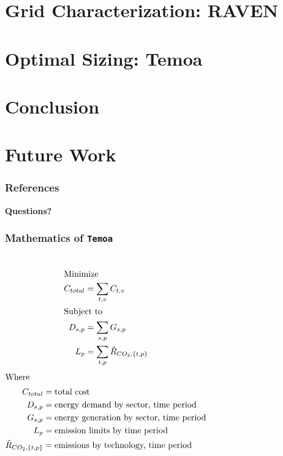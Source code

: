 \documentclass[9pt]{beamer}
\begin{document}
\section{Grid Characterization: RAVEN}

\section{Optimal Sizing: Temoa}

\section{Conclusion}

\section{Future Work}


\begin{frame}[allowframebreaks]
  \frametitle{References}
  
  {\footnotesize  }

\end{frame}
\begin{frame}
  \begin{center}
    \Huge{\textbf{Questions?}}
  \end{center}
\end{frame}


\begin{frame}
  \frametitle{Mathematics of \texttt{Temoa}}
  \begin{columns}
    \column[t]{3cm}
    \begin{align}
      \intertext{Minimize}
      C_{total} &= \sum_{t, v}C_{t, v}\\
      \intertext{Subject to}
      D_{s,p} &= \sum_{s,p}G_{s,p}\nonumber\\
      L_{p} &= \sum_{t,p}\hat{R}_{CO_2,\{t,p\}}\nonumber
    \end{align}
    \column[t]{4cm}
    \begin{align}
      \intertext{Where}
      C_{total} &= \text{total cost}\nonumber\\
      D_{s,p} &= \text{energy demand by sector, time period}\nonumber\\
      G_{s,p} &= \text{energy generation by sector, time period}\nonumber\\
      L_{p} &= \text{emission limits by time period}\nonumber\\
      \hat{R}_{CO_2,\{t,p\}} &= \text{emissions by technology, time period}\nonumber
    \end{align}
  \end{columns}
\end{frame}
\end{document}
